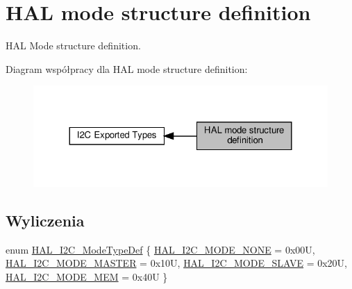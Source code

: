 \hypertarget{group___h_a_l__mode__structure__definition}{}\section{H\+AL mode structure definition}
\label{group___h_a_l__mode__structure__definition}


H\+AL Mode structure definition.  


Diagram współpracy dla H\+AL mode structure definition\+:\nopagebreak
\begin{figure}[H]
\begin{center}
\leavevmode
\includegraphics[width=324pt]{group___h_a_l__mode__structure__definition}
\end{center}
\end{figure}
\subsection*{Wyliczenia}
\begin{DoxyCompactItemize}
\item 
enum \hyperlink{group___h_a_l__mode__structure__definition_gabcbb7b844f2ffd63c4e530c117882062}{H\+A\+L\+\_\+\+I2\+C\+\_\+\+Mode\+Type\+Def} \{ \hyperlink{group___h_a_l__mode__structure__definition_ggabcbb7b844f2ffd63c4e530c117882062a98c8fd642b7ac45a23479bd597fc7a71}{H\+A\+L\+\_\+\+I2\+C\+\_\+\+M\+O\+D\+E\+\_\+\+N\+O\+NE} = 0x00U, 
\hyperlink{group___h_a_l__mode__structure__definition_ggabcbb7b844f2ffd63c4e530c117882062a1eea98660a170dd7b191c9dfe46da6d2}{H\+A\+L\+\_\+\+I2\+C\+\_\+\+M\+O\+D\+E\+\_\+\+M\+A\+S\+T\+ER} = 0x10U, 
\hyperlink{group___h_a_l__mode__structure__definition_ggabcbb7b844f2ffd63c4e530c117882062a817358d19d278261f2047a5ec8ec6b53}{H\+A\+L\+\_\+\+I2\+C\+\_\+\+M\+O\+D\+E\+\_\+\+S\+L\+A\+VE} = 0x20U, 
\hyperlink{group___h_a_l__mode__structure__definition_ggabcbb7b844f2ffd63c4e530c117882062a3f592bd942f973242aac6b7df79f3f1e}{H\+A\+L\+\_\+\+I2\+C\+\_\+\+M\+O\+D\+E\+\_\+\+M\+EM} = 0x40U
 \}
\end{DoxyCompactItemize}


